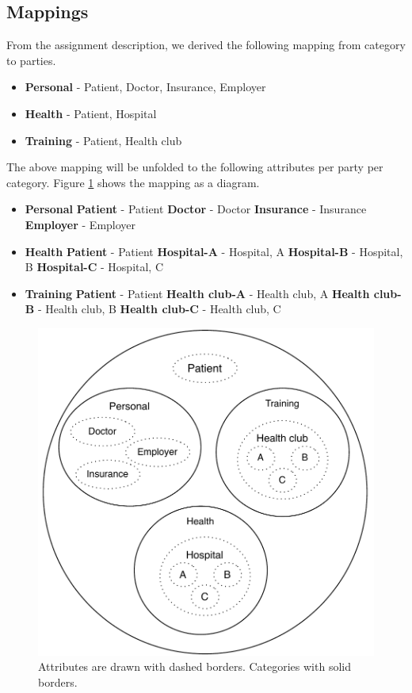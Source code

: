 \documentclass[a4paper]{article}
\begin{document}
	\subsection{Mappings}\label{sec:mappings}
		From the assignment description, we derived the following mapping from category to parties.
		
		\begin{itemize}
			\item \textbf{Personal} - Patient, Doctor, Insurance, Employer
			\item \textbf{Health} - Patient, Hospital
			\item \textbf{Training} - Patient, Health club
		\end{itemize}
		
		The above mapping will be unfolded to the following attributes per party per category. Figure \ref{fig:mapping} shows the mapping as a diagram.
		
		\begin{itemize}
			\item \textbf{Personal}
				\subitem \textbf{Patient} - Patient
				\subitem \textbf{Doctor} - Doctor
				\subitem \textbf{Insurance} - Insurance
				\subitem \textbf{Employer} - Employer
			\item \textbf{Health}
				\subitem \textbf{Patient} - Patient
				\subitem \textbf{Hospital-A} - Hospital, A
				\subitem \textbf{Hospital-B} - Hospital, B
				\subitem \textbf{Hospital-C} - Hospital, C
			\item \textbf{Training}
				\subitem \textbf{Patient} - Patient
				\subitem \textbf{Health club-A} - Health club, A
				\subitem \textbf{Health club-B} - Health club, B
				\subitem \textbf{Health club-C} - Health club, C
		\end{itemize}
	
		\begin{figure}[H]
	        \centering
            \includegraphics[width=0.6\columnwidth]{figures/mapping.pdf}
	     	\caption{Attributes are drawn with dashed borders. Categories with solid borders.}
			\label{fig:mapping}
		\end{figure}
	
\end{document}
